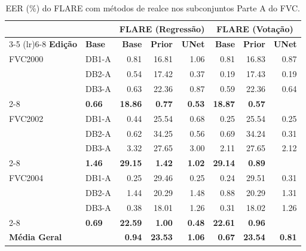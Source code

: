 \begin{table}[htbp]
\centering
\small
\caption{EER (\%) do FLARE com métodos de realce nos subconjuntos Parte A do FVC.}\label{tab:eer_flare_enh}
\setlength{\tabcolsep}{5pt}
\begin{tabular}{ll rrr rrr}
\toprule
 & & \multicolumn{3}{c}{\textbf{FLARE (Regressão)}} & \multicolumn{3}{c}{\textbf{FLARE (Votação)}} \\
\cmidrule(lr){3-5} \cmidrule(lr){6-8}
\textbf{Edição} & \textbf{Base} & \textbf{Base} & \textbf{Prior} & \textbf{UNet} & \textbf{Base} & \textbf{Prior} & \textbf{UNet} \\
\midrule
FVC2000 & DB1-A & 0.81 & 16.81 & 1.06 & 0.81 & 16.83 & 0.87 \\
 & DB2-A & 0.54 & 17.42 & 0.37 & 0.19 & 17.43 & 0.19 \\
 & DB3-A & 0.63 & 22.36 & 0.87 & 0.59 & 22.36 & 0.64 \\
\cmidrule{2-8}
\multicolumn{2}{l}{\textbf{Média FVC2000}} & \textbf{0.66} & \textbf{18.86} & \textbf{0.77} & \textbf{0.53} & \textbf{18.87} & \textbf{0.57} \\
\midrule
FVC2002 & DB1-A & 0.44 & 25.54 & 0.68 & 0.25 & 25.54 & 0.25 \\
 & DB2-A & 0.62 & 34.25 & 0.56 & 0.69 & 34.24 & 0.31 \\
 & DB3-A & 3.32 & 27.65 & 3.00 & 2.11 & 27.65 & 2.12 \\
\cmidrule{2-8}
\multicolumn{2}{l}{\textbf{Média FVC2002}} & \textbf{1.46} & \textbf{29.15} & \textbf{1.42} & \textbf{1.02} & \textbf{29.14} & \textbf{0.89} \\
\midrule
FVC2004 & DB1-A & 0.25 & 29.46 & 0.25 & 0.24 & 29.51 & 0.31 \\
 & DB2-A & 1.44 & 20.29 & 1.48 & 0.88 & 20.29 & 1.31 \\
 & DB3-A & 0.38 & 18.01 & 1.26 & 0.31 & 18.02 & 1.26 \\
\cmidrule{2-8}
\multicolumn{2}{l}{\textbf{Média FVC2004}} & \textbf{0.69} & \textbf{22.59} & \textbf{1.00} & \textbf{0.48} & \textbf{22.61} & \textbf{0.96} \\
\midrule[\heavyrulewidth]
\multicolumn{2}{l}{\textbf{Média Geral}} & \textbf{0.94} & \textbf{23.53} & \textbf{1.06} & \textbf{0.67} & \textbf{23.54} & \textbf{0.81} \\
\bottomrule
\end{tabular}
\end{table}
